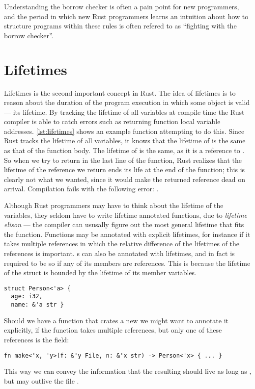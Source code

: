

Understanding the borrow checker is often a pain point for new programmers, and the period in which
new Rust programmers learns an intuition about how to structure programs within these rules is
often refered to as ``fighting with the borrow checker''.


\section{Lifetimes\label{sec:rust-lifetimes}}

Lifetimes is the second important concept in Rust. The idea of lifetimes is to reason about the
duration of the program execution in which some object is valid --- its lifetime. By tracking the
lifetime of all variables at compile time the Rust compiler is able to catch errors such as
returning function local variable addresses. \cref{lst:lifetimes} shows an example function
attempting to do this.   Since Rust tracks the lifetime of all variables,
it knows that the lifetime of  is the same as that of the function body. The lifetime of
 is the same, as it is a reference to . So when we try to return  in the
last line of the function, Rust realizes that the lifetime of the reference we return ends its life
at the end of the function; this is clearly not what we wanted, since it would make the returned
reference dead on arrival. Compilation fails with the following error: .


Although Rust programmers may have to think about the lifetime of the variables, they seldom have
to write lifetime annotated functions, due to \emph{lifetime elison} --- the compiler can ususally
figure out the most general lifetime that fits the function. Functions may be annotated with
explicit lifetimes, for instance if it takes multiple references in which the relative difference
of the lifetimes of the references is important.
s can also be annotated with lifetimes, and in fact is required to be so if any of its
members are references. This is because the lifetime of the struct is bounded by the lifetime of
its member variables.
\begin{lstlisting}[style=Rust]
struct Person<'a> {
  age: i32,
  name: &'a str }
\end{lstlisting}
Should we have a function that crates a new  we might want to annotate it explicitly,
if the function takes multiple references, but only one of these references is the 
field:
\begin{lstlisting}[style=Rust]
fn make<'x, 'y>(f: &'y File, n: &'x str) -> Person<'x> { ... }
\end{lstlisting}
This way we can convey the information that the resulting  should live as long as
, but may outlive the file .



